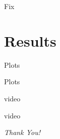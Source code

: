 \documentclass[10pt,compress]{beamer}
\begin{document}
\begin{frame}{Fix}
\end{frame}

\section{Results}

\begin{frame}{Plots}
\end{frame}{Plots}

\begin{frame}{video}
\end{frame}{video}



\begin{frame}{}
  \centering \Huge
  \emph{Thank You!}
\end{frame}

\end{document}
